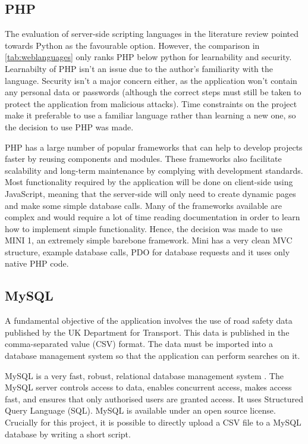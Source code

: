 \documentclass[authoryearcitations]{UoYCSproject}
\begin{document}
\subsection{PHP}

The evaluation of server-side scripting languages in the literature review pointed towards Python as the favourable option. However, the comparison in \autoref{tab:weblanguages} only ranks PHP below python for learnability and security. Learnabilty of PHP isn't an issue due to the author's familiarity with the language. Security isn't a major concern either, as the application won't contain any personal data or passwords (although the correct steps must still be taken to protect the application from malicious attacks). Time constraints on the project make it preferable to use a familiar language rather than learning a new one, so the decision to use PHP was made.

PHP has a large number of popular frameworks that can help to develop projects faster by reusing components and modules. These frameworks also facilitate scalability and long-term maintenance by complying with development standards. Most functionality required by the application will be done on client-side using JavaScript, meaning that the server-side will only need to create dynamic pages and make some simple database calls. Many of the frameworks available are complex and would require a lot of time reading documentation in order to learn how to implement simple functionality. Hence, the decision was made to use MINI 1\citep{MINI}, an extremely simple barebone framework. Mini has a very clean MVC structure, example database calls, PDO for database requests and it uses only native PHP code. 

\subsection{MySQL}

A fundamental objective of the application involves the use of road safety data published by the UK Department for Transport. This data is published in the comma-separated value (CSV) format. The data must be imported into a database management system so that the application can perform searches on it.

MySQL is a very fast, robust, relational database management system \citep{Welling2005}. The MySQL server controls access to data, enables concurrent access, makes access fast, and ensures that only authorised users are granted access. It uses Structured Query Language (SQL). MySQL is available under an open source license. Crucially for this project, it is possible to directly upload a CSV file to a MySQL database by writing a short script.
\end{document}
